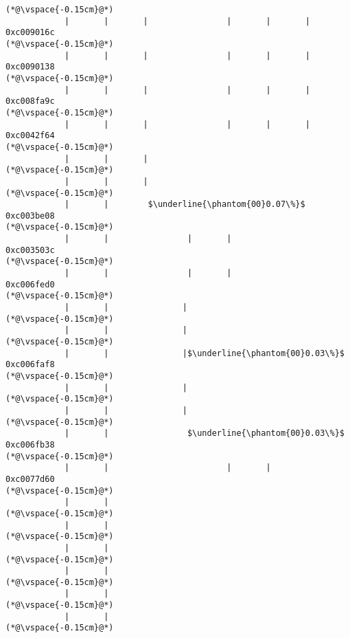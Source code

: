 \begin{lstlisting}[caption=20 viiteparametria Java$\to$C , label=profile:J2CBenchmark00206, numberbychapter=true, frame=lines, float, floatplacement=t]
(*@\vspace{-0.15cm}@*)
            |       |       |                |       |       |               0xc009016c
(*@\vspace{-0.15cm}@*)
            |       |       |                |       |       |               0xc0090138
(*@\vspace{-0.15cm}@*)
            |       |       |                |       |       |               0xc008fa9c
(*@\vspace{-0.15cm}@*)
            |       |       |                |       |       |               0xc0042f64
(*@\vspace{-0.15cm}@*)
            |       |       |
(*@\vspace{-0.15cm}@*)
            |       |       |
(*@\vspace{-0.15cm}@*)
            |       |        $\underline{\phantom{00}0.07\%}$ 0xc003be08
(*@\vspace{-0.15cm}@*)
            |       |                |       |               0xc003503c
(*@\vspace{-0.15cm}@*)
            |       |                |       |               0xc006fed0
(*@\vspace{-0.15cm}@*)
            |       |               |
(*@\vspace{-0.15cm}@*)
            |       |               |
(*@\vspace{-0.15cm}@*)
            |       |               |$\underline{\phantom{00}0.03\%}$ 0xc006faf8
(*@\vspace{-0.15cm}@*)
            |       |               |
(*@\vspace{-0.15cm}@*)
            |       |               |
(*@\vspace{-0.15cm}@*)
            |       |                $\underline{\phantom{00}0.03\%}$ 0xc006fb38
(*@\vspace{-0.15cm}@*)
            |       |                        |       |                       0xc0077d60
(*@\vspace{-0.15cm}@*)
            |       |
(*@\vspace{-0.15cm}@*)
            |       |
(*@\vspace{-0.15cm}@*)
            |       |
(*@\vspace{-0.15cm}@*)
            |       |
(*@\vspace{-0.15cm}@*)
            |       |
(*@\vspace{-0.15cm}@*)
            |       |
(*@\vspace{-0.15cm}@*)

\end{lstlisting}
